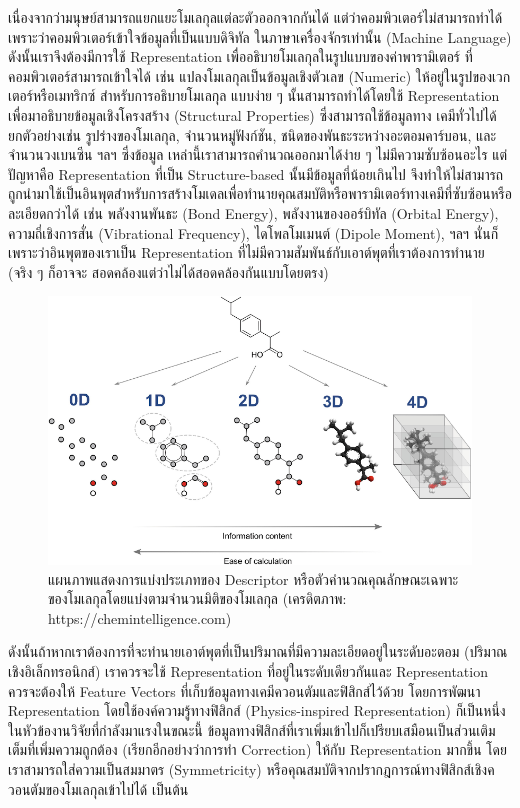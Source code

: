 เนื่องจากว่ามนุษย์สามารถแยกแยะโมเลกุลแต่ละตัวออกจากกันได้ แต่ว่าคอมพิวเตอร์ไม่สามารถทำได้เพราะว่าคอมพิวเตอร์เข้าใจข้อมูลที่เป็นแบบดิจิทัล%
ในภาษาเครื่องจักรเท่านั้น (Machine Language) ดังนั้นเราจึงต้องมีการใช้ Representation เพื่ออธิบายโมเลกุลในรูปแบบของค่าพารามิเตอร์%
ที่คอมพิวเตอร์สามารถเข้าใจได้ เช่น แปลงโมเลกุลเป็นข้อมูลเชิงตัวเลข (Numeric) ให้อยู่ในรูปของเวกเตอร์หรือเมทริกซ์ สำหรับการอธิบายโมเลกุล%
แบบง่าย ๆ นั้นสามารถทำได้โดยใช้ Representation เพื่อมาอธิบายข้อมูลเชิงโครงสร้าง (Structural Properties) ซึ่งสามารถใช้ข้อมูลทาง%
เคมีทั่วไปได้ ยกตัวอย่างเช่น รูปร่างของโมเลกุล, จำนวนหมู่ฟังก์ชัน, ชนิดของพันธะระหว่างอะตอมคาร์บอน, และจำนวนวงเบนซีน ฯลฯ ซึ่งข้อมูล%
เหล่านี้เราสามารถคำนวณออกมาได้ง่าย ๆ ไม่มีความซับซ้อนอะไร แต่ปัญหาคือ Representation ที่เป็น Structure-based นั้นมีข้อมูลที่น้อยเกินไป 
จึงทำให้ไม่สามารถถูกนำมาใช้เป็นอินพุตสำหรับการสร้างโมเดลเพื่อทำนายคุณสมบัติหรือพารามิเตอร์ทางเคมีที่ซับซ้อนหรือละเอียดกว่าได้ เช่น 
พลังงานพันธะ (Bond Energy), พลังงานของออร์บิทัล (Orbital Energy), ความถี่เชิงการสั่น (Vibrational Frequency), ไดโพลโมเมนต์ 
(Dipole Moment), ฯลฯ นั่นก็เพราะว่าอินพุตของเราเป็น Representation ที่ไม่มีความสัมพันธ์กับเอาต์พุตที่เราต้องการทำนาย (จริง ๆ ก็อาจจะ%
สอดคล้องแต่ว่าไม่ได้สอดคล้องกันแบบโดยตรง)

\begin{figure}[htbp]
    \centering
    \includegraphics[width=\linewidth]{fig/descriptor_classes.png}
    \caption{แผนภาพแสดงการแบ่งประเภทของ Descriptor หรือตัวคำนวณคุณลักษณะเฉพาะของโมเลกุลโดยแบ่งตามจำนวนมิติของโมเลกุล 
    (เครดิตภาพ: https://chemintelligence.com)}
    \label{fig:descriptor_classes}
\end{figure}

ดังนั้นถ้าหากเราต้องการที่จะทำนายเอาต์พุตที่เป็นปริมาณที่มีความละเอียดอยู่ในระดับอะตอม (ปริมาณเชิงอิเล็กทรอนิกส์) เราควรจะใช้ Representation 
ที่อยู่ในระดับเดียวกันและ Representation ควรจะต้องให้ Feature Vectors ที่เก็บข้อมูลทางเคมีควอนตัมและฟิสิกส์ไว้ด้วย โดยการพัฒนา 
Representation โดยใช้องค์ความรู้ทางฟิสิกส์ (Physics-inspired Representation) ก็เป็นหนึ่งในหัวข้องานวิจัยที่กำลังมาแรงในขณะนี้ 
ข้อมูลทางฟิสิกส์ที่เราเพิ่มเข้าไปก็เปรียบเสมือนเป็นส่วนเติมเต็มที่เพิ่มความถูกต้อง (เรียกอีกอย่างว่าการทำ Correction) ให้กับ Representation 
มากขึ้น โดยเราสามารถใส่ความเป็นสมมาตร (Symmetricity) หรือคุณสมบัติจากปรากฎการณ์ทางฟิสิกส์เชิงควอนตัมของโมเลกุลเข้าไปได้ เป็นต้น 


